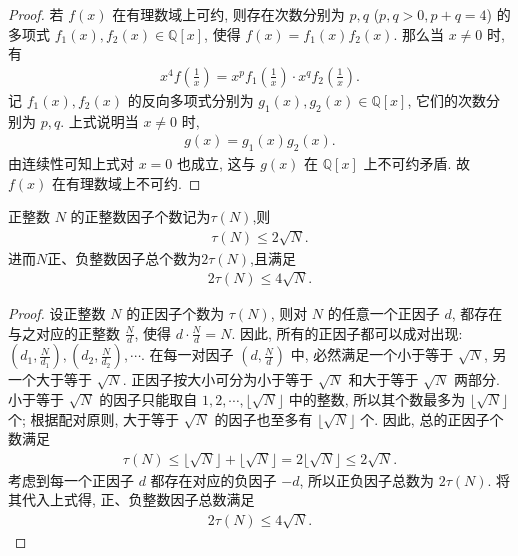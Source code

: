 \documentclass[../../main.tex]{subfiles}%
\begin{document}
\begin{proof}
若 \( f(x) \) 在有理数域上可约, 则存在次数分别为 \( p, q \) (\( p, q > 0, p+q = 4 \)) 的多项式 \( f_1(x), f_2(x) \in \mathbb{Q}[x] \), 使得 \( f(x) = f_1(x)f_2(x) \). 那么当 \( x \neq 0 \) 时, 有
\begin{align*}
x^{4} f\left(\frac{1}{x}\right) = x^{p} f_1\left(\frac{1}{x}\right) \cdot x^{q} f_2\left(\frac{1}{x}\right).
\end{align*}
记 \( f_1(x), f_2(x) \) 的反向多项式分别为 \( g_1(x), g_2(x) \in \mathbb{Q}[x] \), 它们的次数分别为 \( p, q \). 上式说明当 \( x \neq 0 \) 时,
\begin{align*}
g(x) = g_1(x)g_2(x).
\end{align*}
由连续性可知上式对 \( x = 0 \) 也成立, 这与 \( g(x) \) 在 \( \mathbb{Q}[x] \) 上不可约矛盾. 故 \( f(x) \) 在有理数域上不可约.
\end{proof}

\begin{lemma}\label{lemma:正整数因子个数估计}
正整数 \(N\) 的正整数因子个数记为\(\tau(N)\),则
\begin{align*}
\tau(N) \leqslant 2\sqrt{N}.
\end{align*}
进而\(N\)正、负整数因子总个数为$2\tau(N)$,且满足
\begin{align*}
2\tau(N) \leqslant 4\sqrt{N}.
\end{align*}
\end{lemma}
\begin{proof}
设正整数 \(N\) 的正因子个数为 \(\tau(N)\), 则对 \(N\) 的任意一个正因子 \(d\), 都存在与之对应的正整数 \(\frac{N}{d}\), 使得 \(d \cdot \frac{N}{d} = N\). 因此, 所有的正因子都可以成对出现: \((d_1, \frac{N}{d_1}), (d_2, \frac{N}{d_2}), \cdots\).
在每一对因子 \((d, \frac{N}{d})\) 中, 必然满足一个小于等于 \(\sqrt{N}\), 另一个大于等于 \(\sqrt{N}\). 正因子按大小可分为小于等于 \(\sqrt{N}\) 和大于等于 \(\sqrt{N}\) 两部分. 小于等于 \(\sqrt{N}\) 的因子只能取自 \(1,2,\cdots,\lfloor\sqrt{N}\rfloor\) 中的整数, 所以其个数最多为 \(\lfloor\sqrt{N}\rfloor\) 个; 根据配对原则, 大于等于 \(\sqrt{N}\) 的因子也至多有 \(\lfloor\sqrt{N}\rfloor\) 个.
因此, 总的正因子个数满足
\begin{align*}
\tau(N) \leqslant \lfloor\sqrt{N}\rfloor + \lfloor\sqrt{N}\rfloor = 2\lfloor\sqrt{N}\rfloor \leqslant 2\sqrt{N}.
\end{align*}
考虑到每一个正因子 \(d\) 都存在对应的负因子 \(-d\), 所以正负因子总数为 \(2\tau(N)\). 将其代入上式得, 正、负整数因子总数满足
\begin{align*}
2\tau(N) \leqslant 4\sqrt{N}.
\end{align*}
\end{proof}
\end{document}
